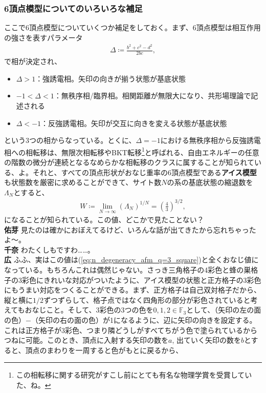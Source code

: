 \documentclass[paper=b5j,fontsize=12Q,jafontsize=12Q,baselineskip=21Q]{jlreq}
\DeclareRobustCommand{\hiron}{\textbf{広 }}
\DeclareRobustCommand{\chinan}{\textbf{千奈 }}
\DeclareRobustCommand{\umen}{\textbf{佑芽 }}
\begin{document}
\begin{refsection}
\subsubsection{6頂点模型についてのいろいろな補足}
ここで6頂点模型についていくつか補足をしておく。まず、6頂点模型は相互作用の強さを表すパラメータ
\begin{align}
  \Delta\coloneqq\frac{b^2+c^2-d^2}{2bc},
\end{align}
で相が決定され、
\begin{itemize}
  \item $\Delta>1$：強誘電相。矢印の向きが揃う状態が基底状態
  \item $-1<\Delta<1$：無秩序相/臨界相。相関距離が無限大になり、共形場理論で記述される
  \item $\Delta<-1$：反強誘電相。矢印が交互に向きを変える状態が基底状態
\end{itemize}
という3つの相からなっている。とくに、$\Delta=-1$における無秩序相から反強誘電相への相転移は、無限次相転移やBKT転移\footnote{この相転移に関する研究がすこし前にとても有名な物理学賞を受賞していた、ね。}と呼ばれる、自由エネルギーの任意の階数の微分が連続となるなめらかな相転移のクラスに属することが知られている、よ。それと、すべての頂点形状がおなじ重率の6頂点模型である\textbf{アイス模型}も状態数を厳密に求めることができて、サイト数$N$の系の基底状態の縮退数を$\Lambda_N$とすると、
\begin{align}
  W\coloneqq\lim_{N\to\infty}(\Lambda_N)^{1/N}=\left(\frac43\right)^{3/2},\label{eq:n_degeneracy_ice_model}
\end{align}
になることが知られている。この値、どこかで見たことない？
\\\umen 見たのは確かにおぼえてるけど、いろんな話が出てきたから忘れちゃったよ〜。
\\\chinan わたくしもですわ……。
\\\hiron ふふ、実はこの値は(\ref{eq:n_degeneracy_afm_q=3_square})と全くおなじ値になっている。もちろんこれは偶然じゃない。さっき三角格子の4彩色と蜂の巣格子の3彩色にきれいな対応がついたように、アイス模型の状態と正方格子の3彩色にもうまい対応をつくることができる。まず、正方格子は自己双対格子だから、縦と横に$1/2$ずつずらして、格子点ではなく四角形の部分が彩色されていると考えてもおなじこと。そして、3彩色の3つの色を$0,1,2\in\mathbb F_3$として、（矢印の左の面の色）$-$（矢印の右の面の色）が1になるように、辺に矢印の向きを設定する。これは正方格子が3彩色、つまり隣どうしがすべてちがう色で塗られているからつねに可能。このとき、頂点に入射する矢印の数を$a$, 出ていく矢印の数を$b$とすると、頂点のまわりを一周すると色がもとに戻るから、

\end{refsection}
\end{document}

